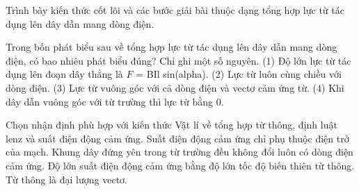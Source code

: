 \begin{bt}
Trình bày kiến thức cốt lõi và các bước giải bài thuộc dạng tổng hợp lực từ tác dụng lên dây dẫn mang dòng điện.
\end{bt}

\begin{ex}
Trong bốn phát biểu sau về tổng hợp lực từ tác dụng lên dây dẫn mang dòng điện, có bao nhiêu phát biểu đúng? Chỉ ghi một số nguyên. (1) Độ lớn lực từ tác dụng lên đoạn dây thẳng là $F$ = BIl sin(alpha). (2) Lực từ luôn cùng chiều với dòng điện. (3) Lực từ vuông góc với cả dòng điện và vectơ cảm ứng từ. (4) Khi dây dẫn vuông góc với từ trường thì lực từ bằng 0.
\end{ex}

\begin{ex}
Chọn nhận định phù hợp với kiến thức Vật lí về tổng hợp từ thông, định luật lenz và suất điện động cảm ứng.
\choice
{Suất điện động cảm ứng chỉ phụ thuộc điện trở của mạch.}
{Khung dây đứng yên trong từ trường đều không đổi luôn có dòng điện cảm ứng.}
{\True Độ lớn suất điện động cảm ứng bằng độ lớn tốc độ biến thiên từ thông.}
{Từ thông là đại lượng vectơ.}
\end{ex}

